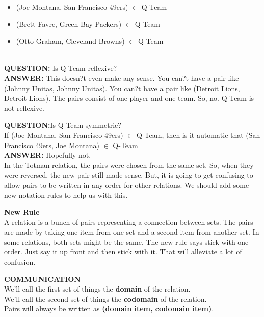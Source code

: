 \documentclass{ximera}
\begin{document}
\begin{example}
\begin{itemize}
 \item (Joe Montana, San Francisco 49ers) $\in$ Q-Team
 \item (Brett Favre, Green Bay Packers) $\in$ Q-Team
 \item (Otto Graham, Cleveland Browns) $\in$ Q-Team
\end{itemize}
\end{example}

\quad \\



\Large{\textbf{QUESTION:}} Is Q-Team reflexive? \\
\textbf{ANSWER:} This doesn?t even make any sense.  You can?t have a pair like (Johnny Unitas, Johnny Unitas). You can?t have a pair like (Detroit Lions, Detroit Lions).  The pairs consist of one player and one team. So, no. Q-Team is not reflexive.


\textbf{QUESTION:}Is Q-Team symmetric?\\
If (Joe Montana, San Francisco 49ers) $\in$ Q-Team, then is it automatic that (San Francisco 49ers, Joe Montana) $\in$ Q-Team\\
\textbf{ANSWER:} Hopefully not. \\
In the Totman relation, the pairs were chosen from the same set.  So, when they were reversed, the new pair still made sense.  But, it is going to get confusing to allow pairs to be written in any order for other relations. We should add some new notation rules to help us with this.


\textbf{New Rule} \\
A relation is a bunch of pairs representing a connection between sets.  The pairs are made by taking one item from one set and a second item from another set. In some relations, both sets might be the same.  The new rule says stick with one order.  Just say it up front and then stick with it.  That will alleviate a lot of confusion.



\begin{remark} \textbf{COMMUNICATION} \\
We'll call the first set of things the \textbf{domain} of the relation. \\
We'll call the second set of things the \textbf{codomain} of the relation.  \\
Pairs will always be written as \textbf{(domain item, codomain item)}.
\end{remark}
\end{document}
